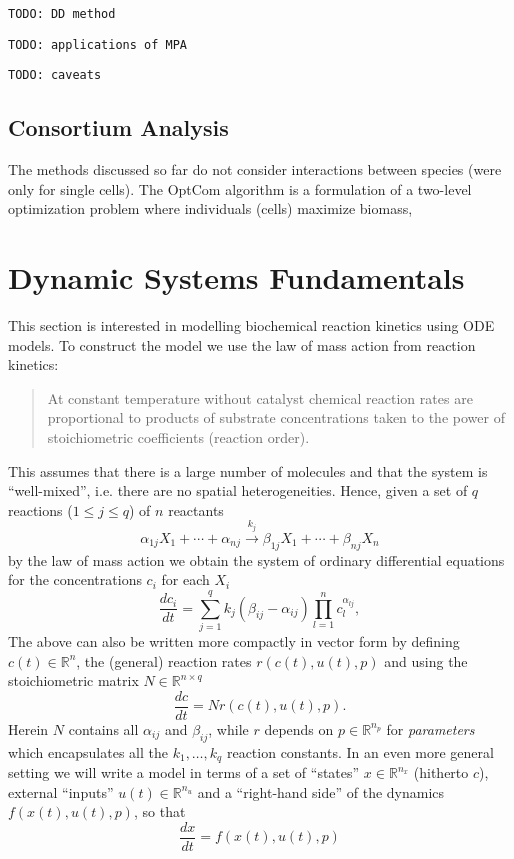 \documentclass[a4paper]{article}
\newcommand{\todo}[1]{\texttt{TODO: #1}}
\theoremstyle{plain}
\theoremstyle{definition}
\theoremstyle{remark}
\begin{document}
\todo{DD method}

\todo{applications of MPA}

\todo{caveats}

\subsection{Consortium Analysis}

The methods discussed so far do not consider interactions between species
(were only for single cells). The OptCom algorithm is a formulation of a
two-level optimization problem where individuals (cells) maximize biomass, 


\section{Dynamic Systems Fundamentals}

This section is interested in modelling biochemical reaction kinetics using
ODE models. To construct the model we use the law of mass action from reaction
kinetics:
\begin{quote}
  At constant temperature without catalyst chemical reaction rates are
  proportional to products of substrate concentrations taken to the power of
  stoichiometric coefficients (reaction order).
\end{quote}
This assumes that there is a large number of molecules and that the system is
``well-mixed'', i.e. there are no spatial heterogeneities. Hence, given a
set of $q$ reactions ($1 \leq j \leq q$) of $n$ reactants
\[
  \alpha_{1j} X_1 + \cdots + \alpha_{nj}
  \stackrel{k_j}{\longrightarrow}
  \beta_{1j} X_1 + \cdots + \beta_{nj} X_n
\]
by the law of mass action we obtain the system of ordinary differential
equations for the concentrations $c_i$ for each $X_i$
\[
  \frac{dc_i}{dt} = \sum_{j=1}^q k_j (\beta_{ij} - \alpha_{ij})
    \prod_{l=1}^n c_l^{\alpha_{lj}},
\]
The above can also be written more compactly in vector form by defining $c(t)
\in \mathbb{R}^{n}$, the (general) reaction rates $r(c(t), u(t), p)$ and using
the stoichiometric matrix $N \in \mathbb{R}^{n \times q}$
\[
  \frac{dc}{dt} = N r(c(t), u(t), p).
\]
Herein $N$ contains all $\alpha_{ij}$ and $\beta_{ij}$, while $r$ depends on
$p \in \mathbb{R}^{n_p}$ for \emph{parameters} which encapsulates all the
$k_1, \ldots, k_q$ reaction constants. In an even more general setting we will
write a model in terms of a set of ``states'' $x \in \mathbb{R}^{n_x}$
(hitherto $c$), external ``inputs'' $u(t) \in \mathbb{R}^{n_u}$ and a
``right-hand side'' of the dynamics $f(x(t), u(t), p)$, so that
\[
  \frac{dx}{dt} = f(x(t), u(t), p)
\]
\end{document}
